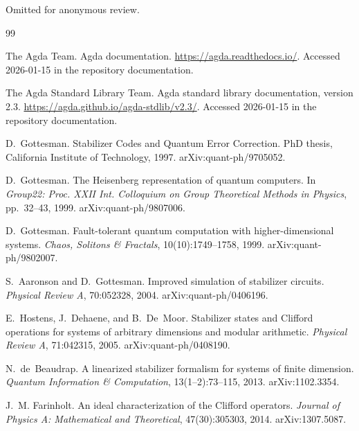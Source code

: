\documentclass[sigplan,screen,review,anonymous]{acmart}
\begin{document}
\begin{acks}
Omitted for anonymous review.
\end{acks}

\begin{thebibliography}{99}

The Agda Team.
\newblock Agda documentation.
\newblock \url{https://agda.readthedocs.io/}.
\newblock Accessed 2026-01-15 in the repository documentation.

The Agda Standard Library Team.
\newblock Agda standard library documentation, version 2.3.
\newblock \url{https://agda.github.io/agda-stdlib/v2.3/}.
\newblock Accessed 2026-01-15 in the repository documentation.

D.~Gottesman.
\newblock Stabilizer Codes and Quantum Error Correction.
\newblock PhD thesis, California Institute of Technology, 1997.
\newblock arXiv:quant-ph/9705052.

D.~Gottesman.
\newblock The Heisenberg representation of quantum computers.
\newblock In \emph{Group22: Proc. XXII Int. Colloquium on Group Theoretical
  Methods in Physics}, pp.~32--43, 1999.
\newblock arXiv:quant-ph/9807006.

D.~Gottesman.
\newblock Fault-tolerant quantum computation with higher-dimensional systems.
\newblock \emph{Chaos, Solitons \& Fractals}, 10(10):1749--1758, 1999.
\newblock arXiv:quant-ph/9802007.

S.~Aaronson and D.~Gottesman.
\newblock Improved simulation of stabilizer circuits.
\newblock \emph{Physical Review A}, 70:052328, 2004.
\newblock arXiv:quant-ph/0406196.

E.~Hostens, J.~Dehaene, and B.~De~Moor.
\newblock Stabilizer states and Clifford operations for systems of arbitrary
  dimensions and modular arithmetic.
\newblock \emph{Physical Review A}, 71:042315, 2005.
\newblock arXiv:quant-ph/0408190.

N.~de~Beaudrap.
\newblock A linearized stabilizer formalism for systems of finite dimension.
\newblock \emph{Quantum Information \& Computation}, 13(1--2):73--115, 2013.
\newblock arXiv:1102.3354.

J.~M. Farinholt.
\newblock An ideal characterization of the Clifford operators.
\newblock \emph{Journal of Physics A: Mathematical and Theoretical},
  47(30):305303, 2014.
\newblock arXiv:1307.5087.


\end{thebibliography}
\end{document}
